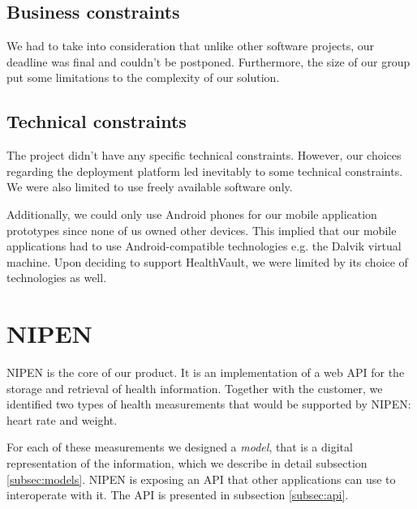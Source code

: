 \subsection{Business constraints}
\label{subsec:business-constraints}

We had to take into consideration that unlike other software projects, our deadline was final
and couldn't be postponed. Furthermore, the size of our group put some limitations
to the complexity of our solution.

\subsection{Technical constraints}

The project didn't have any specific technical constraints.
However, our choices regarding the deployment platform led inevitably to some technical
constraints. We were also limited to use freely available software only.


Additionally, we could only use Android phones for our mobile application prototypes
since none of us owned other devices. This implied that our mobile applications
had to use Android-compatible technologies e.g. the Dalvik virtual machine.
Upon deciding to support HealthVault, we were limited by its choice of
technologies as well.

\section{NIPEN}

NIPEN is the core of our product. 
It is an implementation of a web API for the storage and retrieval of health information.
Together with the customer, we identified two types of health measurements that would be supported by NIPEN: heart rate and weight.

For each of these measurements we designed a \textit{model}, that is a digital representation of the information, which we describe in detail subsection \ref{subsec:models}.
NIPEN is exposing an API that other applications can use to interoperate with it.
The API is presented in subsection \ref{subsec:api}.

